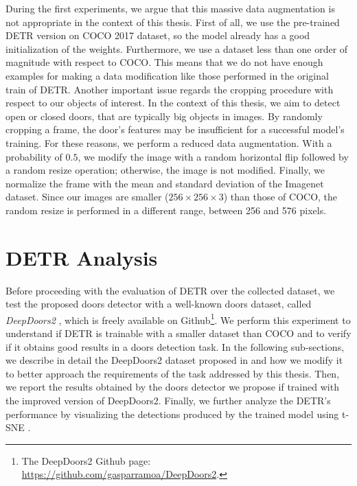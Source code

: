 During the first experiments, we argue that this massive data augmentation is not appropriate in the context of this thesis. First of all, we use the pre-trained DETR version on COCO 2017 dataset, so the model already has a good initialization of the weights. Furthermore, we use a dataset less than one order of magnitude with respect to COCO. This means that we do not have enough examples for making a data modification like those performed in the original train of DETR. Another important issue regards the cropping procedure with respect to our objects of interest. In the context of this thesis, we aim to detect open or closed doors, that are typically big objects in images. By randomly cropping a frame, the door's features may be insufficient for a successful model's training. For these reasons, we perform a reduced data augmentation. With a probability of $0.5$, we modify the image with a random horizontal flip followed by a random resize operation; otherwise, the image is not modified. Finally, we normalize the frame with the mean and standard deviation of the Imagenet dataset. Since our images are smaller ($256 \times 256 \times 3$) than those of COCO, the random resize is performed in a different range, between 256 and 576 pixels. 

\section{DETR Analysis}

Before proceeding with the evaluation of DETR over the collected dataset, we test the proposed doors detector with a well-known doors dataset, called \textit{DeepDoors2} \cite{deepdoors2}, which is freely available on Github\footnote{The DeepDoors2 Github page: \url{https://github.com/gasparramoa/DeepDoors2}.}. We perform this experiment to understand if DETR is trainable with a smaller dataset than COCO and to verify if it obtains good results in a doors detection task. In the following sub-sections, we describe in detail the DeepDoors2 dataset proposed in \cite{deepdoors2} and how we modify it to better approach the requirements of the task addressed by this thesis. Then, we report the results obtained by the doors detector we propose if trained with the improved version of DeepDoors2. Finally, we further analyze the DETR's performance by visualizing the detections produced by the trained model using t-SNE \cite{tsne}.

